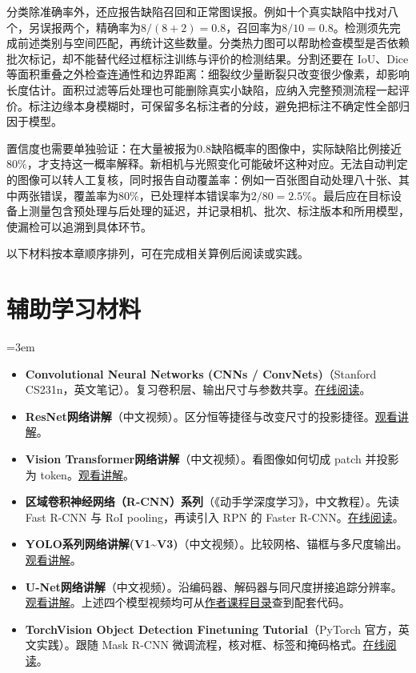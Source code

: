 分类除准确率外，还应报告缺陷召回和正常图误报。例如十个真实缺陷中找对八个，另误报两个，精确率为$8/(8+2)=0.8$，召回率为$8/10=0.8$。检测须先完成前述类别与空间匹配，再统计这些数量。分类热力图可以帮助检查模型是否依赖批次标记，却不能替代经过框标注训练与评价的检测结果。分割还要在 IoU、Dice 等面积重叠之外检查连通性和边界距离：细裂纹少量断裂只改变很少像素，却影响长度估计。面积过滤等后处理也可能删除真实小缺陷，应纳入完整预测流程一起评价。标注边缘本身模糊时，可保留多名标注者的分歧，避免把标注不确定性全部归因于模型。

置信度也需要单独验证：在大量被报为$0.8$缺陷概率的图像中，实际缺陷比例接近$80\%$，才支持这一概率解释。新相机与光照变化可能破坏这种对应。无法自动判定的图像可以转人工复核，同时报告自动覆盖率：例如一百张图自动处理八十张、其中两张错误，覆盖率为$80\%$，已处理样本错误率为$2/80=2.5\%$。最后应在目标设备上测量包含预处理与后处理的延迟，并记录相机、批次、标注版本和所用模型，使漏检可以追溯到具体环节。

以下材料按本章顺序排列，可在完成相关算例后阅读或实践。
\section*{辅助学习材料}
\begingroup
\emergencystretch=3em
\begin{itemize}
\item \textbf{Convolutional Neural Networks (CNNs / ConvNets)}（Stanford CS231n，英文笔记）。复习卷积层、输出尺寸与参数共享。\href{https://cs231n.github.io/convolutional-networks/}{在线阅读}。
\item \textbf{ResNet网络讲解}（中文视频）。区分恒等捷径与改变尺寸的投影捷径。\href{https://www.bilibili.com/video/BV1T7411T7wa}{观看讲解}。
\item \textbf{Vision Transformer网络讲解}（中文视频）。看图像如何切成 patch 并投影为 token。\href{https://www.bilibili.com/video/BV1Jh411Y7WQ}{观看讲解}。
\item \textbf{区域卷积神经网络（R-CNN）系列}（《动手学深度学习》，中文教程）。先读 Fast R-CNN 与 RoI pooling，再读引入 RPN 的 Faster R-CNN。\href{https://zh.d2l.ai/chapter\_computer-vision/rcnn.html}{在线阅读}。
\item \textbf{YOLO系列网络讲解(V1\textasciitilde V3)}（中文视频）。比较网格、锚框与多尺度输出。\href{https://www.bilibili.com/video/BV1yi4y1g7ro}{观看讲解}。
\item \textbf{U-Net网络讲解}（中文视频）。沿编码器、解码器与同尺度拼接追踪分辨率。\href{https://www.bilibili.com/video/BV1Vq4y127fB/}{观看讲解}。上述四个模型视频均可从\href{https://github.com/WZMIAOMIAO/deep-learning-for-image-processing}{作者课程目录}查到配套代码。
\item \textbf{TorchVision Object Detection Finetuning Tutorial}（PyTorch 官方，英文实践）。跟随 Mask R-CNN 微调流程，核对框、标签和掩码格式。\href{https://docs.pytorch.org/tutorials/intermediate/torchvision\_tutorial.html}{在线阅读}。
\end{itemize}
\endgroup
